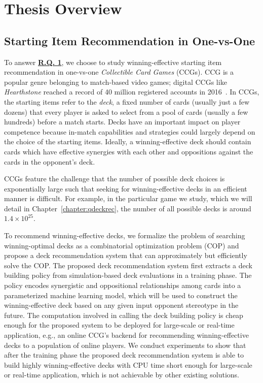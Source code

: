 \section{Thesis Overview}\label{sec:thesis_overview}

\subsection{Starting Item Recommendation in One-vs-One}\label{sec:thesis_overview:item_recom}

To answer \hyperref[rq1]{\textbf{R.Q. 1}}, we choose to study winning-effective starting item recommendation in one-vs-one \textit{Collectible Card Games} (CCGs). CCG is a popular genre belonging to match-based video games; digital CCGs like \textit{Hearthstone} reached a record of 40 million registered accounts in 2016~\cite{hearthstonepopular}. In CCGs, the starting items refer to the \textit{deck}, a fixed number of cards (usually just a few dozens) that every player is asked to select from a pool of cards (usually a few hundreds) before a match starts. Decks have an important impact on player competence because in-match capabilities and strategies could largely depend on the choice of the starting items. Ideally, a winning-effective deck should contain cards which have effective synergies with each other and oppositions against the cards in the opponent's deck. 

CCGs feature the challenge that the number of possible deck choices is exponentially large such that seeking for winning-effective decks in an efficient manner is difficult. For example, in the particular game we study, which we will detail in Chapter~\ref{chapter:qdeckrec}, the number of all possible decks is around $1.4 \times 10^{25}$. 

To recommend winning-effective decks, we formalize the problem of searching winning-optimal decks as a combinatorial optimization problem (COP) and propose a deck recommendation system that can approximately but efficiently solve the COP. The proposed deck recommendation system first extracts a deck building policy from simulation-based deck evaluations in a training phase. The policy encodes synergistic and oppositional relationships among cards into a parameterized machine learning model, which will be used to construct the winning-effective deck based on any given input opponent stereotype in the future. The computation involved in calling the deck building policy is cheap enough for the proposed system to be deployed for large-scale or real-time application, e.g., an online CCG's backend for recommending winning-effective decks to a population of online players. We conduct experiments to show that after the training phase the proposed deck recommendation system is able to build highly winning-effective decks with CPU time short enough for large-scale or real-time application, which is not achievable by other existing solutions. 

